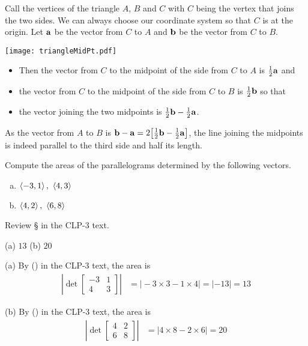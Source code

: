 \begin{solution}
Call the vertices of the triangle $A$, $B$ and $C$ with $C$ being the
vertex that joins the two sides. We can always
choose our coordinate system so that $C$ is at the origin.
Let $\mathbf{a}$ be the vector from $C$ to $A$ 
and $\mathbf{b}$ be the vector from $C$ to $B$.
\begin{center}
     \texttt{[image: triangleMidPt.pdf]}
\end{center}
\begin{itemize}
\item
Then the vector from $C$ to the midpoint of the side from $C$ to $A$ is
$\tfrac{1}{2}\mathbf{a}$ and
\item
the vector from $C$ to the midpoint of the side from $C$ to $B$ is
$\tfrac{1}{2}\mathbf{b}$ so that
\item
the vector joining the two midpoints is $\tfrac{1}{2}\mathbf{b}-\tfrac{1}{2}\mathbf{a}$. 
\end{itemize}
As the vector from $A$ to $B$ is $\mathbf{b}-\mathbf{a}=2\big[\tfrac{1}{2}\mathbf{b}-\tfrac{1}{2}\mathbf{a}\big]$,
the line joining the midpoints is indeed parallel to the third side
and half its length.
\end{solution}


\begin{question}
Compute the areas of the parallelograms determined by the
following vectors.
\begin{enumerate}[(a)]
\item
$\left< -3,1\right>,\ \left< 4,3\right>$ 
\item
$\left< 4,2\right>,\ \left< 6,8\right>$
\end{enumerate}
\end{question}

\begin{hint}
Review \S{} in the CLP-3 text.
\end{hint}

\begin{answer}
(a) $13$\qquad
(b) $20$
\end{answer}

\begin{solution} (a)
By () in the CLP-3 text, the area is 
\begin{align*}
\left| \det\left[\begin{matrix}-3&1 \\ 4&3 \end{matrix}\right] \right|
  &=\big|-3\times 3-1\times 4\big| = |-13| = 13
\end{align*}

(b)
By () in the CLP-3 text, the area is 
\begin{align*}
\left|\det\left[\begin{matrix} 4&2 \\ 6&8 \end{matrix}\right]\right| 
&=\big|4\times 8-2\times 6\big| 
= 20
\end{align*}
\end{solution}

